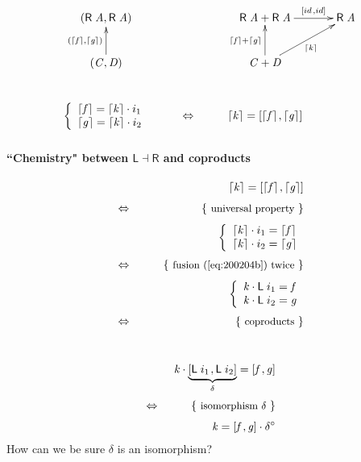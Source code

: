 \documentclass{elsarticle}
\newcommand{\Conid}[1]{\mathit{#1}}
\newcommand{\Varid}[1]{\mathit{#1}}
\def\myxym#1{\vcenter{\xymatrix{#1}}}
\newenvironment{lcbr}{\left\{\begin{array}{l}}{\end{array}\right.}
\def\alt#1#2{\mathopen{[}#1\hskip 1pt,#2\mathclose{]}}
\def\comp{ \mathbin{\cdot} }
\def\conv#1{#1^\circ}
\def\fun#1{\mathsf{#1}}
\def\just#1#2{\\ &#1& \rule{2em}{0pt} \{ \mbox{\rule[-.7em]{0pt}{1.8em} \small #2 \/} \} \nonumber\\ && }
\def\start{&&}
\def\equiv{\Leftrightarrow}
\begin{document}
\begin{eqnarray*}
\myxym{
	\ensuremath{(\fun R \;\Conid{A},\fun R \;\Conid{A})}
&&
	\ensuremath{\fun R \;\Conid{A}\mathbin{+}\fun R \;\Conid{A}}
	\ar[r]^-{\ensuremath{\alt{{id}}{{id}}}}
&
	\ensuremath{\fun R \;\Conid{A}}
\\
	\ensuremath{(\Conid{C},\Conid{D})}
	\ar[u]^{\ensuremath{(\lceil \Varid{f}\rceil,\lceil \Varid{g}\rceil)}}
&&
	\ensuremath{\Conid{C}\mathbin{+}\Conid{D}}
	\ar[u]^{\ensuremath{\lceil \Varid{f}\rceil\mathbin{+}\lceil \Varid{g}\rceil}}
	\ar[ru]_{\ensuremath{\lceil \Varid{k}\rceil}}
\\
	\ensuremath{\begin{lcbr}\lceil \Varid{f}\rceil\mathrel{=}\lceil \Varid{k}\rceil \comp i_1\\\lceil \Varid{g}\rceil\mathrel{=}\lceil \Varid{k}\rceil \comp i_2\end{lcbr}}
&
	\equiv
&
	\ensuremath{\lceil \Varid{k}\rceil\mathrel{=}\alt{\lceil \Varid{f}\rceil}{\lceil \Varid{g}\rceil}}
}
\end{eqnarray*}
%

\paragraph{``Chemistry" between \ensuremath{\fun L \mathbin\dashv \fun R } and coproducts}
\begin{eqnarray*}
\start
	\ensuremath{\lceil \Varid{k}\rceil\mathrel{=}\alt{\lceil \Varid{f}\rceil}{\lceil \Varid{g}\rceil}}
%
\just\equiv{ universal property }
%
	\ensuremath{\begin{lcbr}\lceil \Varid{k}\rceil \comp i_1\mathrel{=}\lceil \Varid{f}\rceil\\\lceil \Varid{k}\rceil \comp i_2\mathrel{=}\lceil \Varid{g}\rceil\end{lcbr}}
%
\just\equiv{ fusion (\ref{eq:200204b}) twice }
%
	\ensuremath{\begin{lcbr}\Varid{k} \comp \fun L \;i_1\mathrel{=}\Varid{f}\\\Varid{k} \comp \fun L \;i_2\mathrel{=}\Varid{g}\end{lcbr}}
%
%
\just\equiv{ coproducts }
%
\end{eqnarray*}

\begin{eqnarray*}
\start
	\ensuremath{\Varid{k} \comp \underbrace{\alt{\fun L \;i_1}{\fun L \;i_2}}_{\delta}\mathrel{=}\alt{\Varid{f}}{\Varid{g}}}
%
\just\equiv{ {isomorphism} \ensuremath{\delta} }
%
	\ensuremath{\Varid{k}\mathrel{=}\alt{\Varid{f}}{\Varid{g}} \comp \conv{\delta}}
%
\end{eqnarray*}
%
How can we be sure \ensuremath{\delta} is an isomorphism?
%
\end{document}
